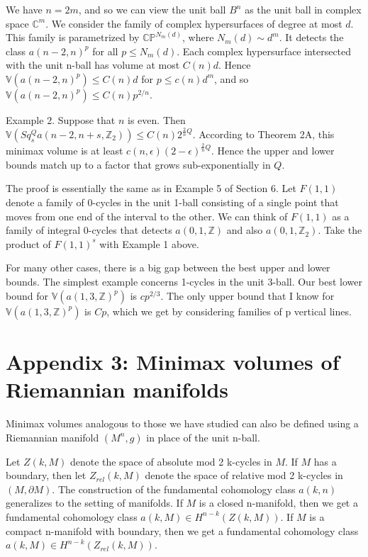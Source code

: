 \documentclass{amsart}
\newtheorem*{Theorem 1}{Theorem 1}
\newtheorem*{Theorem 2}{Theorem 2}
\newtheorem*{Theorem 1A}{Theorem 1A}
\newtheorem*{Theorem 2A}{Theorem 2A}
\newtheorem*{vanishing lemma}{Vanishing Lemma}
\numberwithin{equation}{section}
\begin{document}
\proof We have $n=2m$, and so we can view the unit ball $B^n$ as
the unit ball in complex space $\mathbb{C}^m$.  We consider the
family of complex hypersurfaces of degree at most $d$. This
family is parametrized by $\mathbb{CP}^{N_m(d)}$, where $N_m(d)
\sim d^m$.  It detects the class $a(n-2,n)^p$ for all $p \le
N_m(d)$.  Each complex hypersurface intersected with the unit
n-ball has volume at most $C(n) d$.  Hence
$\mathbb{V}(a(n-2,n)^p) \le C(n) d$ for $p \le c(n) d^m$, and so
$\mathbb{V}(a(n-2,n)^p) \le C(n) p^{2/n}$.
\endproof

Example 2. Suppose that $n$ is even.  Then $\mathbb{V}(Sq_s^Q
a(n-2, n+s, \mathbb{Z}_2)) \le C(n) 2^{\frac{2}{n} Q}$. 
According to Theorem 2A, this minimax volume is at least $c(n,
\epsilon) (2- \epsilon)^{\frac{2}{n} Q}$.  Hence the upper and
lower bounds match up to a factor that grows sub-exponentially in
$Q$.

\proof The proof is essentially the same as in Example 5 of
Section 6.  Let $F(1,1)$ denote a family of 0-cycles in the unit
1-ball consisting of a single point that moves from one end of
the interval to the other.  We can think of $F(1,1)$ as a family
of integral 0-cycles that detects $a(0,1, \mathbb{Z})$ and also
$a(0,1, \mathbb{Z}_2)$.  Take the product of $F(1,1)^s$ with
Example 1 above. \endproof

For many other cases, there is a big gap between the best upper
and lower bounds.  The simplest example concerns 1-cycles in the
unit 3-ball.  Our best lower bound for $\mathbb{V}(a(1,3,
\mathbb{Z})^p)$ is $c p^{2/3}$.  The only upper bound that I know
for $\mathbb{V}(a(1,3,\mathbb{Z})^p)$ is $C p$, which we get by
considering families of p vertical lines.


\section{Appendix 3: Minimax volumes of Riemannian manifolds}

Minimax volumes analogous to those we have studied can also be
defined using a Riemannian manifold $(M^n,g)$ in place of the
unit n-ball.

Let $Z(k,M)$ denote the space of absolute mod 2 k-cycles in $M$. 
If $M$ has a boundary, then let $Z_{rel}(k, M)$ denote the space
of relative mod 2 k-cycles in $(M, \partial M)$. The construction
of the fundamental cohomology class $a(k,n)$ generalizes to the
setting of manifolds.  If $M$ is a closed n-manifold, then we get
a fundamental cohomology class $a(k,M) \in H^{n-k}(Z(k,M))$.  If
$M$ is a compact n-manifold with boundary, then we get a
fundamental cohomology class $a(k,M) \in H^{n-k}(Z_{rel}(k,M))$.
\end{document}

